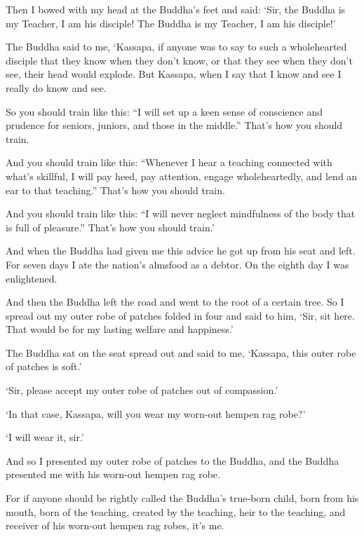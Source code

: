 \documentclass[12pt,openany]{book}%
\begin{document}
Then I bowed with my head at the Buddha’s feet and said: ‘Sir, the Buddha is my Teacher, I am his disciple! The Buddha is my Teacher, I am his disciple!’ 

The Buddha said to me, ‘Kassapa, if anyone was to say to such a wholehearted disciple that they know when they don’t know, or that they see when they don’t see, their head would explode. But Kassapa, when I say that I know and see I really do know and see. 

So you should train like this: “I will set up a keen sense of conscience and prudence for seniors, juniors, and those in the middle.” That’s how you should train. 

And you should train like this: “Whenever I hear a teaching connected with what’s skillful, I will pay heed, pay attention, engage wholeheartedly, and lend an ear to that teaching.” That’s how you should train. 

And you should train like this: “I will never neglect mindfulness of the body that is full of pleasure.” That’s how you should train.’ 

And when the Buddha had given me this advice he got up from his seat and left. For seven days I ate the nation’s almsfood as a debtor. On the eighth day I was enlightened. 

And then the Buddha left the road and went to the root of a certain tree. So I spread out my outer robe of patches folded in four and said to him, ‘Sir, sit here. That would be for my lasting welfare and happiness.’ 

The Buddha sat on the seat spread out and said to me, ‘Kassapa, this outer robe of patches is soft.’ 

‘Sir, please accept my outer robe of patches out of compassion.’ 

‘In that case, Kassapa, will you wear my worn-out hempen rag robe?’ 

‘I will wear it, sir.’ 

And so I presented my outer robe of patches to the Buddha, and the Buddha presented me with his worn-out hempen rag robe. 

For if anyone should be rightly called the Buddha’s true-born child, born from his mouth, born of the teaching, created by the teaching, heir to the teaching, and receiver of his worn-out hempen rag robes, it’s me. 
\end{document}
